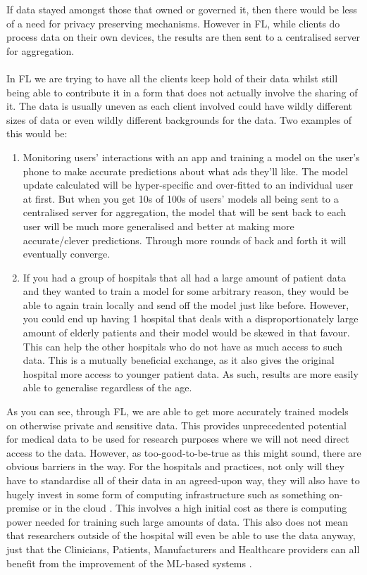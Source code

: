 If data stayed amongst those that owned or governed it, then there would be less of a need for privacy preserving mechanisms. 
However in FL, while clients do process data on their own devices, the results are then sent to a centralised server for aggregation. 
\\ \\
In FL we are trying to have all the clients keep hold of their data whilst still being able to contribute it in a form that does not actually involve the sharing of it. The data is usually uneven as each client involved could have wildly different sizes of data or even wildly different backgrounds for the data. Two examples of this would be:
\begin{enumerate}
    \item Monitoring users' interactions with an app and training a model on the user's phone to make accurate predictions about what ads they'll like. 
    The model update calculated will be hyper-specific and over-fitted to an individual user at first. 
    But when you get 10s of 100s of users' models all being sent to a centralised server for aggregation, the model that will be sent back to each user will be much more generalised and better at making more accurate/clever predictions. 
    Through more rounds of back and forth it will eventually converge.
    
    \item If you had a group of hospitals that all had a large amount of patient data and they wanted to train a model for some arbitrary reason, they would be able to again train locally and send off the model just like before. 
    However, you could end up having 1 hospital that deals with a disproportionately large amount of elderly patients and their model would be skewed in that favour. 
    This can help the other hospitals who do not have as much access to such data. 
    This is a mutually beneficial exchange, as it also gives the original hospital more access to younger patient data. 
    As such, results are more easily able to generalise regardless of the age.
\end{enumerate}
As you can see, through FL, we are able to get more accurately trained models on otherwise private and sensitive data. 
This provides unprecedented potential for medical data to be used for research purposes where we will not need direct access to the data. However, as too-good-to-be-true as this might sound, there are obvious barriers in the way. 
For the hospitals and practices, not only will they have to standardise all of their data in an agreed-upon way, they will also have to hugely invest in some form of computing infrastructure such as something on-premise or in the cloud \cite{future_health_fl}. 
This involves a high initial cost as there is computing power needed for training such large amounts of data. 
This also does not mean that researchers outside of the hospital will even be able to use the data anyway, just that the Clinicians, Patients, Manufacturers and Healthcare providers can all benefit from the improvement of the ML-based systems \cite{future_health_fl}.

